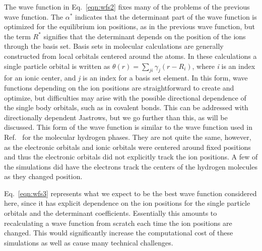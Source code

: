 \documentclass[aip,jcp,numerical,reprint]{revtex4-1}
\begin{document}
The wave function in Eq.~\eqref{eqn:wfs2} fixes many of the problems of the previous wave function.  
The $\alpha^{*}$ indicates that the determinant part of the wave function is optimized for the equilibrium ion positions, as in the previous wave function, but the term $R^{*}$ signifies that the determinant  depends on the position of the ions through the basis set.  Basis sets in molecular calculations are generally constructed from local orbitals centered around the atoms.  In these calculations a single particle orbital is written as $\theta(r) = \sum_{ji}\gamma_{j}(r-R_{i})$, where \textit{i} is an index for an ionic center, and \textit{j} is an index for a basis set element.  
In this form, wave functions depending on the ion positions are straightforward to create and optimize,
but difficulties may arise with the possible directional dependence of the single body orbitals, such as in covalent bonds. This can be addressed with directionally dependent Jastrows, but we go further than this, as will be discussed.  This form of the wave function is similar to the wave function used in Ref.~\cite{ceperley3} for the molecular hydrogen phases.   They are not quite the same, however, as the electronic orbitals and ionic orbitals were centered around fixed positions and thus the electronic orbitals did not explicitly track the ion positions.   A few of the simulations did have the electrons track the centers of the hydrogen molecules as they changed position.

Eq.~\eqref{eqn:wfs3} represents what we expect to be the best wave function considered here, since it has explicit dependence on the ion positions for the single particle orbitals and the determinant coefficients. Essentially this amounts to recalculating a wave function from scratch each time the ion positions are changed.  This would significantly increase the computational cost of these simulations as well as cause many technical challenges. 
\end{document}
